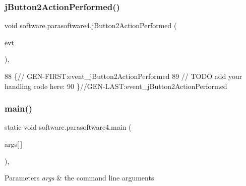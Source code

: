 \subsubsection{\texorpdfstring{j\+Button2\+Action\+Performed()}{jButton2ActionPerformed()}}
{\footnotesize\ttfamily void software.\+parasoftware4.\+j\+Button2\+Action\+Performed (\begin{DoxyParamCaption}\item[{java.\+awt.\+event.\+Action\+Event}]{evt }\end{DoxyParamCaption})\hspace{0.3cm}{\ttfamily [inline]}, {\ttfamily [private]}}


\begin{DoxyCode}
88                                                                          \{\textcolor{comment}{//
      GEN-FIRST:event\_jButton2ActionPerformed}
89         \textcolor{comment}{// TODO add your handling code here:}
90     \}\textcolor{comment}{//GEN-LAST:event\_jButton2ActionPerformed}
\end{DoxyCode}
\mbox{\label{classsoftware_1_1parasoftware4_a0d3e015a84b29f2c3a169f951e2e3452}} 
\subsubsection{\texorpdfstring{main()}{main()}}
{\footnotesize\ttfamily static void software.\+parasoftware4.\+main (\begin{DoxyParamCaption}\item[{String}]{args\mbox{[}$\,$\mbox{]} }\end{DoxyParamCaption})\hspace{0.3cm}{\ttfamily [inline]}, {\ttfamily [static]}}


\begin{DoxyParams}{Parameters}
{\em args} & the command line arguments \\
\hline
\end{DoxyParams}

